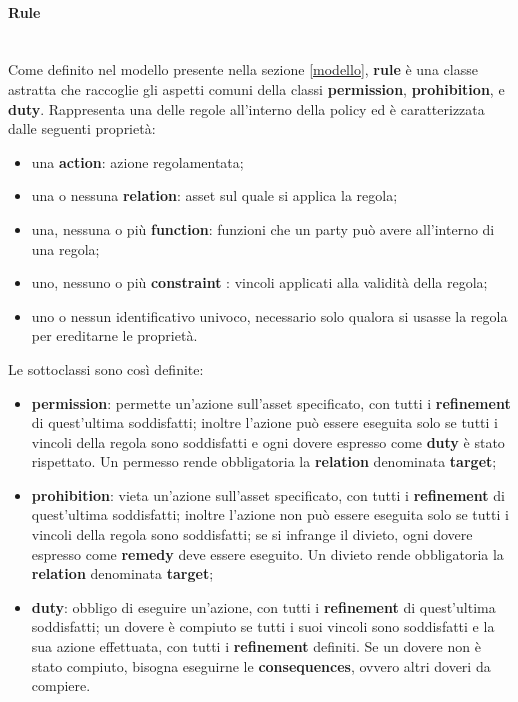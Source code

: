 \documentclass[12pt,a4paper,twoside]{book}
\begin{document}
\paragraph{Rule}\label{ODRLRulePara}\mbox{}\\
Come definito nel modello presente nella sezione \ref{modello}, \textbf{rule} è una classe astratta che raccoglie gli aspetti comuni della classi  \textbf{permission}, \textbf{prohibition}, e \textbf{duty}. Rappresenta una delle regole all'interno della policy ed è caratterizzata dalle seguenti proprietà:
\begin{itemize}
	\item una \textbf{action}: azione regolamentata;
	\item una o nessuna \textbf{relation}: asset sul quale si applica la regola;
	\item una, nessuna o più \textbf{function}: funzioni che un party può avere all'interno di una regola;
	\item uno, nessuno o più \textbf{constraint }: vincoli applicati alla validità della regola;
	\item uno o nessun identificativo univoco, necessario solo qualora si usasse la regola per ereditarne le proprietà.
\end{itemize}
Le sottoclassi sono così definite:
\begin{itemize}
	\item \textbf{permission}: permette un'azione sull'asset specificato, con tutti i \textbf{refinement} di quest'ultima soddisfatti; inoltre l'azione può essere eseguita solo se tutti i vincoli della regola sono soddisfatti e ogni dovere espresso come \textbf{duty} è stato rispettato. Un permesso rende obbligatoria la \textbf{relation} denominata \textbf{target};
	\item \textbf{prohibition}: vieta un'azione sull'asset specificato, con tutti i \textbf{refinement} di quest'ultima soddisfatti; inoltre l'azione non può essere eseguita solo se tutti i vincoli della regola sono soddisfatti; se si infrange il divieto, ogni dovere espresso come \textbf{remedy} deve essere eseguito. Un divieto rende obbligatoria la \textbf{relation} denominata \textbf{target};
	\item \textbf{duty}: obbligo di eseguire un'azione, con tutti i \textbf{refinement} di quest'ultima soddisfatti; un dovere è compiuto se tutti i suoi vincoli sono soddisfatti e la sua azione effettuata, con tutti i \textbf{refinement} definiti. Se un dovere non è stato compiuto, bisogna eseguirne le \textbf{consequences}, ovvero altri doveri da compiere.
\end{itemize}
\end{document}
